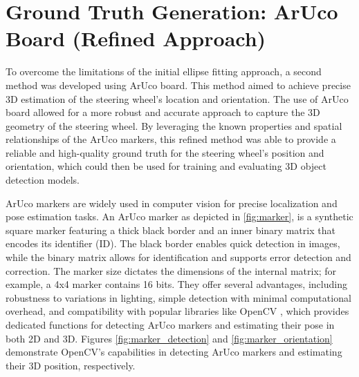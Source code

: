 \section{Ground Truth Generation: ArUco Board (Refined Approach)}
To overcome the limitations of the initial ellipse fitting 
approach, a second method was developed using ArUco board. This method aimed to achieve precise 3D estimation of the steering wheel's location and orientation. 
The use of ArUco board allowed for a more robust and accurate approach to capture the 3D 
geometry of the steering wheel. By leveraging the known 
properties and spatial relationships of the ArUco markers, 
this refined method was able to provide a reliable and 
high-quality ground truth for the steering wheel's position 
and orientation, which could then be used for training and 
evaluating 3D object detection models.

ArUco markers \cite{opencv_aruco_detection} are widely used  in 
computer vision for precise localization and pose estimation 
tasks.  An ArUco marker as depicted in \cref{fig:marker}, is a 
synthetic square marker featuring a  thick black border and an 
inner binary matrix that encodes  its identifier (ID). The black 
border enables quick detection  in images, while the binary 
matrix allows for identification  and supports error detection 
and correction.  The marker size dictates the dimensions of the 
internal matrix;  for example, a 4x4 marker contains 16 bits. They offer 
several advantages, including robustness to  variations in 
lighting, simple detection with minimal  computational overhead, 
and compatibility with popular  libraries like OpenCV \cite{opencv_library}, which 
provides dedicated functions for detecting ArUco markers and 
estimating their pose in both 2D  and 3D. Figures \cref{fig:marker_detection} and \cref{fig:marker_orientation} demonstrate OpenCV's capabilities in detecting ArUco markers and 
estimating their 3D position, respectively. 

